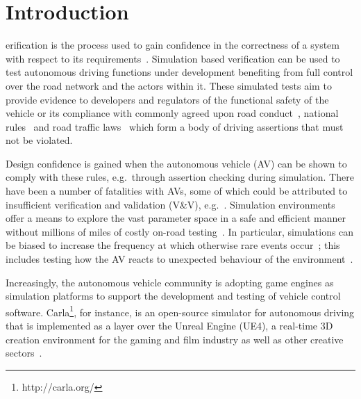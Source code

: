\documentclass[letterpaper, 10 pt, journal, twoside]{IEEEtran}
\begin{document}
\section{Introduction} \label{s:introduction}
erification is the process used to gain confidence in the correctness of a system with respect to its requirements~\cite{bergeron2012writing}. Simulation based verification can be used to test autonomous driving functions under development benefiting from full control over the road network and the actors within it. These simulated tests aim to provide evidence to developers and regulators of the functional safety of the vehicle or its compliance with commonly agreed upon road conduct~\cite{ViennaConv}, national rules~\cite{codes2015highway} and road traffic laws~\cite{RoadTraffic1988} which form a body of driving assertions that must not be violated. 

Design confidence is gained when the autonomous vehicle (AV) can be shown to comply with these rules, e.g.\ through assertion checking during simulation. 
There have been a number of fatalities with AVs, some of which could be attributed to insufficient verification and validation (V\&V), e.g.~\cite{FatalityExample}. Simulation environments offer a means to explore the vast parameter space in a safe and efficient manner~\cite{korosec2019waymo} without millions of miles of costly on-road testing~\cite{kalra2016driving}. In particular, simulations can be biased to increase the frequency at which otherwise rare events occur~\cite{Koopman2018}; this includes testing how the AV reacts to unexpected behaviour of the environment~\cite{RobustnessAutonomy}. 

Increasingly, the autonomous vehicle community is adopting game engines as simulation platforms to support the development and testing of vehicle control software. 
%
Carla\footnote{http://carla.org/}, for instance, is an open-source simulator for autonomous driving that is implemented as a layer over the Unreal Engine (UE4), a  real-time 3D creation environment for the gaming and film industry as well as other creative sectors~\cite{CARLA_paper}. 
\end{document}

